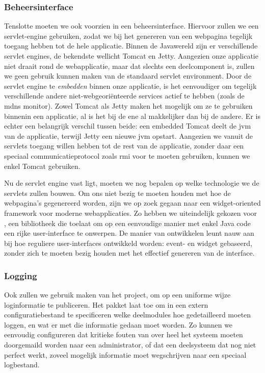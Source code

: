 \documentclass[verslag.tex]{subfiles}
\begin{document}
\subsubsection{Beheersinterface}

Tenslotte moeten we ook voorzien in een beheersinterface. Hiervoor zullen we een servlet-engine gebruiken, zodat we bij het genereren van een webpagina tegelijk toegang hebben tot de hele applicatie. Binnen de Javawereld zijn er verschillende servlet engines, de bekendste wellicht Tomcat en Jetty. Aangezien onze applicatie niet draait rond de webapplicatie, maar dat slechts een deelcomponent is, zullen we geen gebruik kunnen maken van de standaard servlet environment. Door de servlet engine te \emph{embedden} binnen onze applicatie, is het eenvoudiger om tegelijk verschillende andere niet-webgeoriënteerde services actief te hebben (zoals de \ac{mdns} monitor). Zowel Tomcat als Jetty maken het mogelijk om ze te gebruiken binnenin een applicatie, al is het bij de ene al makkelijker dan bij de andere. Er is echter een belangrijk verschil tussen beide: een embedded Tomcat deelt de \ac{jvm} van de applicatie, terwijl Jetty een nieuwe \ac{jvm} opstart. Aangezien we vanuit de servlets toegang willen hebben tot de rest van de applicatie, zonder daar een speciaal communicatieprotocol zoals \ac{rmi} voor te moeten gebruiken, kunnen we enkel Tomcat gebruiken.

Nu de servlet engine vast ligt, moeten we nog bepalen op welke technologie we de servlets zullen bouwen. Om ons niet bezig te moeten houden met hoe de webpagina's gegenereerd worden, zijn we op zoek gegaan naar een widget-oriented framework voor moderne webapplicaties. Zo hebben we uiteindelijk gekozen voor , een bibliotheek die toelaat om op een eenvoudige manier met enkel Java code een rijke user-interface te onwerpen. De manier van ontwikkelen leunt nauw aan bij hoe reguliere user-interfaces ontwikkeld worden: event- en widget gebaseerd, zonder zich te moeten bezig houden met het effectief genereren van de interface.

\subsubsection{Logging}

Ook zullen we gebruik maken van het  project, om op een uniforme wijze loginformatie te publiceren. Het pakket laat toe om in een extern configuratiebestand te specificeren welke deelmodules hoe gedetailleerd moeten loggen, en wat er met die informatie gedaan moet worden. Zo kunnen we eenvoudig configureren dat kritieke fouten van over heel het systeem moeten doorgemaild worden naar een administrator, of dat een deelsysteem dat nog niet perfect werkt, zoveel mogelijk informatie moet wegschrijven naar een speciaal logbestand.
\end{document}
